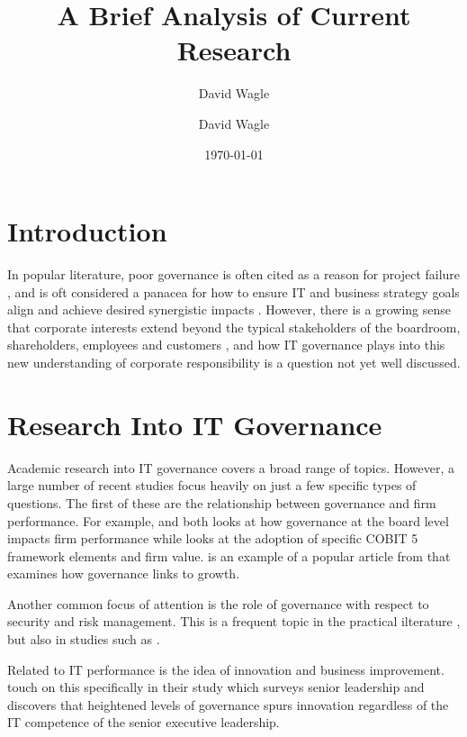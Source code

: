 \documentclass[stu]{apa7}
\title{A Brief Analysis of Current Research}
\author{David Wagle}
\affiliation{School of Business, Northcentral University}
\author{David Wagle}
\date{\today}
\title{}
\begin{document}
\maketitle

\section{Introduction}
\label{sec:org9b806b2}

In popular literature, poor governance is often cited as a reason for project failure \parencite{zahreddineCouncilPostWhat2019}, and is oft considered a panacea for how to ensure IT and business strategy goals align and achieve desired synergistic impacts \parencite{lindrosWhatITGovernance2017}. However, there is a growing sense that corporate interests extend beyond the typical stakeholders of the boardroom, shareholders, employees and customers \parencite{paineGuideBigIdeas2019}, and how IT governance plays into this new understanding of corporate responsibility is a question not yet well discussed.

\section{Research Into IT Governance}
\label{sec:orgad89a9e}

Academic research into IT governance covers a broad range of topics. However, a large number of recent studies focus heavily on just a few specific types of questions. The first of these are the relationship between governance and firm performance. For example, \textcite{turelBoardITGovernance2019} and \textcite{hamdanITGovernanceFirm2019} both looks at how governance at the board level impacts firm performance while \textcite{haesAdoptionImpactIT2016} looks at the adoption of specific COBIT 5 framework elements and firm value. \textcite{zahreddineCouncilPostWhat2019} is an example of a popular article from that examines how governance links to growth.

Another common focus of attention is the role of governance with respect to security and risk management. This is a frequent topic in the practical ilterature \parencite{rossSixITDecisions2002,patryCouncilPostWhy2021}, but also in studies such as \textcite{mallmannAdoptionCloudComputing2018,zhangDoesSharingMake2019}.

Related to IT performance is the idea of innovation and business improvement. \textcite{herouxModeratingRoleITbusiness2018} touch on this specifically in their study which surveys senior leadership and discovers that heightened levels of governance spurs innovation regardless of the IT competence of the senior executive leadership.
\end{document}

